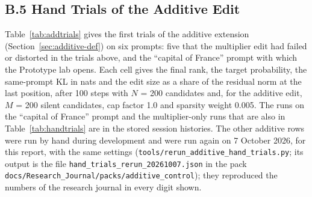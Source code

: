 \documentclass[12pt,a4paper]{report}
\begin{document}
\subsection*{B.5 Hand Trials of the Additive Edit}
Table~\ref{tab:addtrials} gives the first trials of the additive extension (Section~\ref{sec:additive-def}) on six prompts: five that the multiplier edit had failed or distorted in the trials above, and the ``capital of France'' prompt with which the Prototype lab opens. Each cell gives the final rank, the target probability, the same-prompt KL in nats and the edit size as a share of the residual norm at the last position, after 100 steps with $N$ = 200 candidates and, for the additive edit, $M$ = 200 silent candidates, cap factor 1.0 and sparsity weight 0.005. The runs on the ``capital of France'' prompt and the multiplier-only runs that are also in Table~\ref{tab:handtrials} are in the stored session histories. The other additive rows were run by hand during development and were run again on 7 October 2026, for this report, with the same settings (\texttt{tools/\allowbreak{}rerun\_\allowbreak{}additive\_\allowbreak{}hand\_\allowbreak{}trials.\allowbreak{}py}; its output is the file \texttt{hand\_\allowbreak{}trials\_\allowbreak{}rerun\_\allowbreak{}20261007.\allowbreak{}json} in the pack \texttt{docs/\allowbreak{}Research\_\allowbreak{}Journal/\allowbreak{}packs/\allowbreak{}additive\_\allowbreak{}control}); they reproduced the numbers of the research journal in every digit shown.
\end{document}
